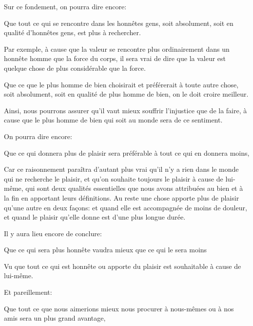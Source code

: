 \bigbreak

Sur ce fondement, on pourra dire encore:

\begin{emphpar}
	Que tout ce qui se rencontre dans les honnêtes gens, soit absolument, soit en qualité d’honnêtes gens, est plus à rechercher.
\end{emphpar}

Par exemple, à cause que la valeur se rencontre plus ordinairement dans un honnête homme que la force du corps, il sera vrai de
dire que la valeur est quelque chose de plus considérable que la force.

\bigbreak

\begin{emphpar}
	Que ce que le plus homme de bien choisirait et préférerait à toute autre chose, soit absolument, soit en qualité de plus homme de
	bien, on le doit croire meilleur.
\end{emphpar}

Ainsi, nous pourrons assurer qu'il vaut mieux souffrir l'injustice que de la faire, à cause que le plus homme de bien qui soit au monde
sera de ce sentiment.

On pourra dire encore:

\begin{emphpar}
	Que ce qui donnera plus de plaisir sera préférable à tout ce qui en donnera moins,
\end{emphpar}

Car ce raisonnement paraîtra d'autant plus vrai qu'il n'y a rien dans le monde qui ne recherche le plaisir, et qu'on souhaite
toujours le plaisir à cause de lui-même, qui sont deux qualités essentielles que nous avons attribuées au bien et à la fin en
apportant leurs définitions. Au reste une chose apporte plus de plaisir qu'une autre en deux façons: et quand elle est
accompagnée de moins de douleur, et quand le plaisir qu'elle donne est d'une plus longue durée.

Il y aura lieu encore de conclure:

\begin{emphpar}
	Que ce qui sera plus honnête vaudra mieux que ce qui le sera moins
\end{emphpar}

Vu que tout ce qui est honnête ou apporte du plaisir est souhaitable à cause de lui-même.

\bigbreak

Et pareillement:

\begin{emphpar}
	Que tout ce que nous aimerions mieux nous procurer à nous-mêmes ou à nos amis sera un plus grand avantage,
\end{emphpar}

